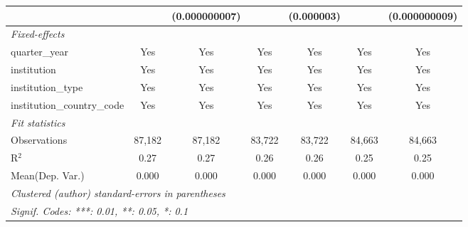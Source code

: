 \begin{tabular}{lcccccc}
                                      &              & (0.000000007) &              & (0.000003)     &              & (0.000000009)\\   
   \midrule
   \emph{Fixed-effects}\\
   quarter\_year                      & Yes          & Yes           & Yes          & Yes            & Yes          & Yes\\  
   institution                        & Yes          & Yes           & Yes          & Yes            & Yes          & Yes\\  
   institution\_type                  & Yes          & Yes           & Yes          & Yes            & Yes          & Yes\\  
   institution\_country\_code         & Yes          & Yes           & Yes          & Yes            & Yes          & Yes\\  
   \midrule
   \emph{Fit statistics}\\
   Observations                       & 87,182       & 87,182        & 83,722       & 83,722         & 84,663       & 84,663\\  
   R$^2$                              & 0.27         & 0.27          & 0.26         & 0.26           & 0.25         & 0.25\\  
Mean(Dep. Var.) & 0.000 & 0.000 & 0.000 & 0.000 & 0.000 & 0.000 \\
   \midrule \midrule
   \multicolumn{7}{l}{\emph{Clustered (author) standard-errors in parentheses}}\\
   \multicolumn{7}{l}{\emph{Signif. Codes: ***: 0.01, **: 0.05, *: 0.1}}\\
\end{tabular}
\par\endgroup
